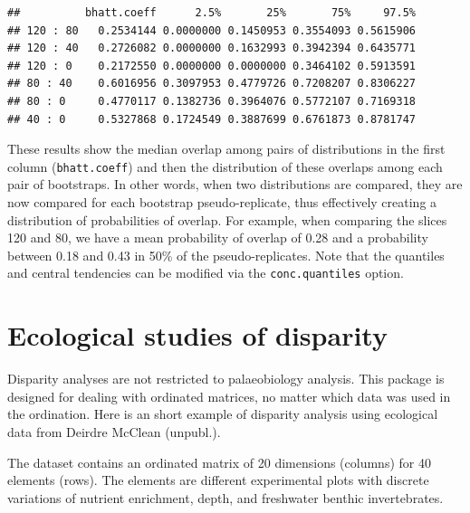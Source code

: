 \documentclass[]{book}
\newenvironment{Shaded}{\begin{snugshade}}{\end{snugshade}}
\newcommand{\KeywordTok}[1]{\textcolor[rgb]{0.13,0.29,0.53}{\textbf{#1}}}
\newcommand{\StringTok}[1]{\textcolor[rgb]{0.31,0.60,0.02}{#1}}
\newcommand{\OperatorTok}[1]{\textcolor[rgb]{0.81,0.36,0.00}{\textbf{#1}}}
\newcommand{\NormalTok}[1]{#1}
\theoremstyle{definition}
\theoremstyle{definition}
\theoremstyle{remark}
\begin{document}
\begin{verbatim}
##          bhatt.coeff      2.5%       25%       75%     97.5%
## 120 : 80   0.2534144 0.0000000 0.1450953 0.3554093 0.5615906
## 120 : 40   0.2726082 0.0000000 0.1632993 0.3942394 0.6435771
## 120 : 0    0.2172550 0.0000000 0.0000000 0.3464102 0.5913591
## 80 : 40    0.6016956 0.3097953 0.4779726 0.7208207 0.8306227
## 80 : 0     0.4770117 0.1382736 0.3964076 0.5772107 0.7169318
## 40 : 0     0.5327868 0.1724549 0.3887699 0.6761873 0.8781747
\end{verbatim}

These results show the median overlap among pairs of distributions in
the first column (\texttt{bhatt.coeff}) and then the distribution of
these overlaps among each pair of bootstraps. In other words, when two
distributions are compared, they are now compared for each bootstrap
pseudo-replicate, thus effectively creating a distribution of
probabilities of overlap. For example, when comparing the slices 120 and
80, we have a mean probability of overlap of 0.28 and a probability
between 0.18 and 0.43 in 50\% of the pseudo-replicates. Note that the
quantiles and central tendencies can be modified via the
\texttt{conc.quantiles} option.

\section{Ecological studies of
disparity}\label{ecological-studies-of-disparity}

Disparity analyses are not restricted to palaeobiology analysis. This
package is designed for dealing with ordinated matrices, no matter which
data was used in the ordination. Here is an short example of disparity
analysis using ecological data from Deirdre McClean (unpubl.).

The dataset contains an ordinated matrix of 20 dimensions (columns) for
40 elements (rows). The elements are different experimental plots with
discrete variations of nutrient enrichment, depth, and freshwater
benthic invertebrates.

\begin{Shaded}
\end{Shaded}
\end{document}

